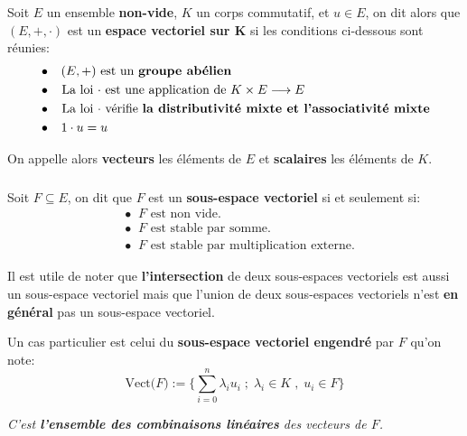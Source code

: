 \chapter*{} %

\subsection*{}
Soit \(E\) un ensemble \textbf{non-vide}, \(K\) un corps commutatif, et \(u \in E\), on dit alors que \((E, +, \cdot)\) est un \textbf{espace vectoriel sur K} si les conditions ci-dessous sont réunies:
\begin{align*}
   &\bullet \;\;\; (E, +) \text{ est un \textbf{groupe abélien}} \\
   &\bullet \;\; \text{ La loi \(\cdot\) est une application de \(K \times E \longrightarrow E\)} \\
   &\bullet \;\; \text{ La loi \(\cdot\) vérifie \textbf{la distributivité mixte et l'associativité mixte}} \\
   &\bullet \;\;\; 1 \cdot u = u
\end{align*}

On appelle alors \textbf{vecteurs} les éléments de \(E\) et \textbf{scalaires} les éléments de \(K\).
\subsection*{}
Soit \(F \subseteq E\), on dit que \(F\) est un \textbf{sous-espace vectoriel} si et seulement si:
\begin{align*}
   &\bullet \;\; F \text{ est non vide.} \\
   &\bullet \;\; F \text{ est stable par somme.} \\
   &\bullet \;\; F \text{ est stable par multiplication externe.}
\end{align*}

Il est utile de noter que \textbf{l'intersection} de deux sous-espaces vectoriels est aussi un sous-espace vectoriel mais que l'union de deux sous-espaces vectoriels n'est \textbf{en général} pas un sous-espace vectoriel.\<

Un cas particulier est celui du \textbf{sous-espace vectoriel engendré} par \(F\) qu'on note:
\[
   \text{Vect(\(F\))} := \Biggl\{ \sum_{i=0}^{n} \lambda_i u_i\; ; \; \lambda_{i} \in K \; , \; u_{i} \in F \Biggl\}
\]
\begin{center}
    \textit{
        C'est \textbf{l'ensemble des combinaisons linéaires} des vecteurs de \(F\).
    }
\end{center}

